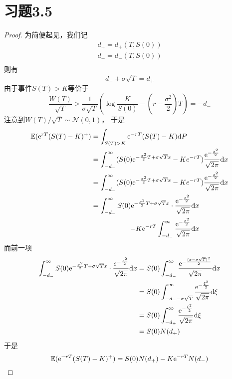 \documentclass[cn]{homework}
\newcommand{\E}{\mathbb E}
\begin{document}
    \section{习题3.5}
    \begin{proof}
        为简便起见，我们记
        \[\begin{aligned}
            d_+=d_+(T,S(0))\\
            d_-=d_-(T,S(0))\\
        \end{aligned}\]
        则有
        \[d_-+\sigma\sqrt T=d_+\]
        由于事件$S(T)>K$等价于
        \[\frac{W(T)}{\sqrt{T}}>
        \frac{1}{\sigma\sqrt{T}}
        \left(\log\frac{K}{S(0)}-\left(r-\frac{\sigma^2}2\right)T\right)=-d_-\]
        注意到$W(T)/\sqrt{T}\sim\mathcal N(0,1)$，
        于是
        \[\begin{aligned}
            \E(\e^{rT}(S(T)-K)^+)
            &=\int_{S(T)>K}\e^{-rT}(S(T)-K)\diff P\\
            &=\int_{-d_-}^\infty
              (S(0)\e^{-\frac{\sigma^2}{2}T+\sigma\sqrt{T}x}
              -Ke^{-rT})\frac{\e^{-\frac{x^2}{2}}}{\sqrt{2\pi}}\diff x\\
            &=\int_{-d_-}^\infty
              (S(0)\e^{-\frac{\sigma^2}{2}T+\sigma\sqrt{T}x}
              -Ke^{-rT})\frac{\e^{-\frac{x^2}{2}}}{\sqrt{2\pi}}\diff x\\
            &=\begin{aligned}[t]
                \int_{-d_-}^\infty S(0)\e^{-\frac{\sigma^2}{2}T+\sigma\sqrt{T}x}
                \cdot\frac{\e^{-\frac{x^2}{2}}}{\sqrt{2\pi}}\diff x\\
                -K\e^{-rT}\int_{-d_-}^\infty
                \frac{\e^{-\frac{x^2}{2}}}{\sqrt{2\pi}}\diff x
            \end{aligned}
        \end{aligned}\]
        而前一项
        \[\begin{aligned}
            \int_{-d_-}^\infty S(0)
            \mathrm e^{-\frac{\sigma^2}{2}T+\sigma\sqrt{T}x}
            \cdot\frac{e^{-\frac{x^2}{2}}}{\sqrt{2\pi}}\mathrm d x
            &=S(0)\int_{-d_-}^\infty
             \frac{\mathrm e^{-\frac{(x-\sigma\sqrt{T})^2}{2}}}{\sqrt{2\pi}}\mathrm d x\\
            &=S(0)\int_{-d_--\sigma\sqrt{T}}^\infty\frac{\mathrm e^{-\frac{\xi^2}{2}}}{\sqrt{2\pi}}
             \mathrm d\xi\\
            &=S(0)\int_{-d_+}^\infty\frac{\mathrm e^{-\frac{\xi^2}{2}}}{\sqrt{2\pi}}
             \mathrm d\xi\\
            &=S(0)N(d_+)
        \end{aligned}\]
        于是
        \[\E(\e^{-rT}(S(T)-K)^+)=S(0)N(d_+)-K\e^{-rT}N(d_-)\]
    \end{proof}
\end{document}
